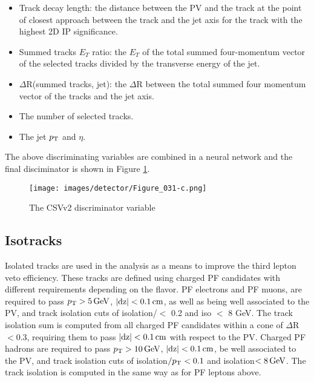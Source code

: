 \begin{itemize}
\item Track decay length: the distance between the PV and the track at the point of closest approach between the track and the jet axis for the track with the highest 2D IP significance.
\item Summed tracks $E_T$ ratio: the $E_T$ of the total summed four-momentum vector of the selected tracks divided by the transverse energy of the jet.
\item $\Delta$R(summed tracks, jet): the $\Delta$R between the total summed four momentum vector of the tracks and the jet axis.
\item The number of selected tracks.
\item The jet $p_{\mathrm{T}}$ and $\eta$.
\end{itemize}
The above discriminating variables are combined in a neural network and the final disciminator is shown in Figure \ref{fig:CSVv2}.
\begin{figure}[!h]
\centering
\texttt{[image: images/detector/Figure\_031-c.png]}\\
\caption{The CSVv2 discriminator variable\cite{Sirunyan:2017ezt}}
\label{fig:CSVv2}
\end{figure}
\subsection*{Isotracks}\label{sec:isotracks}
\noindent
\justify
Isolated tracks are used in the analysis as a means to improve the third lepton veto efficiency. 
These tracks are defined using charged PF candidates with different requirements depending on the flavor. 
PF electrons and PF muons, are required to pass $p_{\mathrm{T}}>5\,\text{Ge\hspace{-.08em}V}$, $|\mathrm{dz}|<0.1\,\text{cm}$, as well as being well associated to the PV, and track isolation cuts of isolation/\pt $<$ 0.2 and iso $<$ 8 GeV. 
The track isolation sum is computed from all charged PF candidates within a cone of $\Delta$R$<0.3$, requiring them to pass $|\mathrm{dz}|<0.1\,\text{cm}$ with respect to the PV. 
Charged PF hadrons are required to pass $p_{\mathrm{T}}>10\,\text{Ge\hspace{-.08em}V}$, $|\mathrm{dz}|<0.1\,\text{cm}$, be well associated to the PV, and track isolation cuts of isolation$/p_{\mathrm{T}}<0.1$ and isolation$<8\,\text{Ge\hspace{-.08em}V}$. 
The track isolation is computed in the same way as for PF leptons above.

